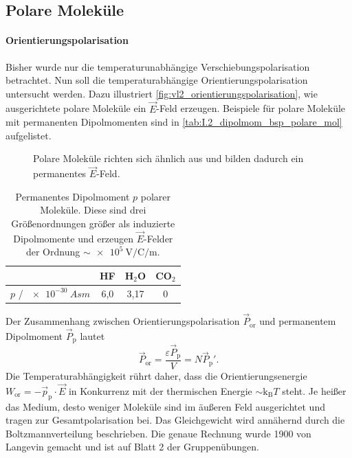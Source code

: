 \subsection{Polare Moleküle}
\paragraph{Orientierungspolarisation}
    Bisher wurde nur die temperaturunabhängige Verschiebungspolarisation betrachtet. Nun soll die temperaturabhängige Orientierungspolarisation untersucht werden. Dazu illustriert \autoref{fig:vl2_orientierungspolarisation}, wie ausgerichtete polare Moleküle ein $\vec E$-Feld erzeugen. Beispiele für polare Moleküle mit permanenten Dipolmomenten sind in \autoref{tab:I.2_dipolmom_bsp_polare_mol} aufgelistet.
    \begin{figure}[H]
        \centering
        \caption{Polare Moleküle richten sich ähnlich aus und bilden dadurch ein permanentes $\vec E$-Feld.}
        \label{fig:vl2_orientierungspolarisation}
    \end{figure}
    \vspace{-0.5cm}
    \begin{table}[H]
        \centering
        \caption{Permanentes Dipolmoment $p$ polarer Moleküle. Diese sind drei Größenordnungen größer als induzierte Dipolmomente und erzeugen $\vec E$-Felder der Ordnung $\sim\SI{e5}{\volt\per\coulomb\per\meter}$.}
        \begin{tabular}{|l||ccc|}\hline
             &HF&H${}_2$O&CO${}_2$  \\\hline
             $p$ / $\SI{e-30}{Asm}$&6,0&3,17&0 \\\hline
        \end{tabular}
        \label{tab:I.2_dipolmom_bsp_polare_mol}
    \end{table}
    Der Zusammenhang zwischen Orientierungspolarisation $\vec P_\text{or}$ und permanentem Dipolmoment $\vec P_\text{p}$ lautet
    $$
    \vec{P}_{\text{or}} = \frac{ \varepsilon \vec{P}_{\text{p}}}{ V} = N \vec{P}_\text{p}'.
    $$ 
    Die Temperaturabhängigkeit rührt daher, dass die Orientierungsenergie $W_{\text{or}}= - \vec{p}_\text{p}\cdot\vec{E}$ in Konkurrenz mit der thermischen Energie $ \sim \mathrm{k}_{\mathrm{B}} T$ steht. Je heißer das Medium, desto weniger Moleküle sind im äußeren Feld ausgerichtet und tragen zur Gesamtpolarisation bei. Das Gleichgewicht wird annähernd durch die Boltzmannverteilung beschrieben. Die genaue Rechnung wurde 1900 von Langevin gemacht und ist auf Blatt 2 der Gruppenübungen.\\
    

